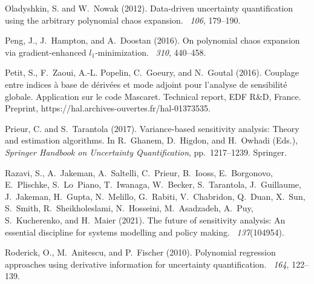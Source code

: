 \documentclass[a4paper,11pt]{article}
\theoremstyle{definition}
\theoremstyle{remark}
\theoremstyle{theorem}
\begin{document}
\begin{thebibliography}{}
	Oladyshkin, S. and W.~Nowak (2012).
	\newblock Data-driven uncertainty quantification using the arbitrary polynomial
	chaos expansion.
	~{\em 106},
	179--190.
	
	Peng, J., J.~Hampton, and A.~Doostan (2016).
	\newblock On polynomial chaos expansion via gradient-enhanced
	$l_1$-minimization.
	~{\em 310}, 440--458.
	
	Petit, S., F.~Zaoui, A.-L. Popelin, C.~Goeury, and N.~Goutal (2016).
	\newblock Couplage entre indices \`a base de d\'eriv\'ees et mode adjoint pour
	l'analyse de sensibilit\'e globale. {A}pplication sur le code {M}ascaret.
	\newblock Technical report, EDF R\&D, France.
	\newblock Preprint, https://hal.archives-ouvertes.fr/hal-01373535.
	
	Prieur, C. and S.~Tarantola (2017).
	\newblock Variance-based sensitivity analysis: {T}heory and estimation
	algorithms.
	\newblock In R.~Ghanem, D.~Higdon, and H.~Owhadi (Eds.), {\em Springer Handbook
		on {Uncertainty Quantification}}, pp.\  1217--1239. Springer.
	
	Razavi, S., A.~Jakeman, A.~Saltelli, C.~Prieur, B.~Iooss, E.~Borgonovo,
	E.~Plischke, S.~Lo~Piano, T.~Iwanaga, W.~Becker, S.~Tarantola, J.~Guillaume,
	J.~Jakeman, H.~Gupta, N.~Melillo, G.~Rabiti, V.~Chabridon, Q.~Duan, X.~Sun,
	S.~Smith, R.~Sheikholeslami, N.~Hosseini, M.~Asadzadeh, A.~Puy,
	S.~Kucherenko, and H.~Maier (2021).
	\newblock The future of sensitivity analysis: An essential discipline for
	systems modelling and policy making.
	~{\em 137\/}(104954).
	
	Roderick, O., M.~Anitescu, and P.~Fischer (2010).
	\newblock Polynomial regression approaches using derivative information for
	uncertainty quantification.
	~{\em 164}, 122--139.
	

\end{thebibliography}
\end{document}
